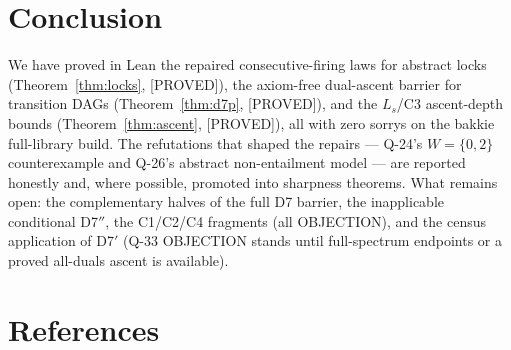 \documentclass[11pt,a4paper]{article}
\theoremstyle{definition}
\begin{document}
\section{Conclusion}

We have proved in Lean the repaired consecutive-firing laws for
abstract locks (Theorem~\ref{thm:locks}, [PROVED]), the axiom-free
dual-ascent barrier for transition DAGs (Theorem~\ref{thm:d7p},
[PROVED]), and the $L_s$/C3 ascent-depth bounds
(Theorem~\ref{thm:ascent}, [PROVED]), all with zero sorrys on the
bakkie full-library build. The refutations that shaped the repairs ---
Q-24's $W=\{0,2\}$ counterexample and Q-26's abstract non-entailment
model --- are reported honestly and, where possible, promoted into
sharpness theorems. What remains open: the complementary halves of the
full D7 barrier, the inapplicable conditional D7$''$, the C1/C2/C4
fragments (all OBJECTION), and the census application of D7$'$ (Q-33
OBJECTION stands until full-spectrum endpoints or a proved all-duals
ascent is available).

\section{References}
\end{document}
